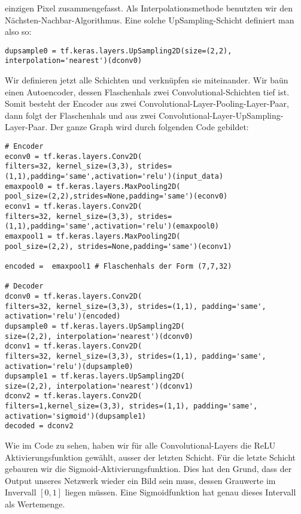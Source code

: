 einzigen Pixel zusammengefasst. Als Interpolationsmethode benutzten wir den Nächsten-Nachbar-Algorithmus.
Eine solche UpSampling-Schicht definiert man also so:
\begin{verbatim}
dupsample0 = tf.keras.layers.UpSampling2D(size=(2,2), interpolation='nearest')(dconv0)
\end{verbatim}
Wir definieren jetzt alle Schichten und verknüpfen sie miteinander. Wir baün
einen Autoencoder, dessen Flaschenhals zwei Convolutional-Schichten tief ist.
Somit besteht der Encoder aus zwei Convolutional-Layer-Pooling-Layer-Paar, dann
folgt der Flaschenhals und aus zwei Convolutional-Layer-UpSampling-Layer-Paar.
Der ganze Graph wird durch folgenden Code gebildet:
\begin{verbatim}
# Encoder
econv0 = tf.keras.layers.Conv2D(
filters=32, kernel_size=(3,3), strides=(1,1),padding='same',activation='relu')(input_data)
emaxpool0 = tf.keras.layers.MaxPooling2D(
pool_size=(2,2),strides=None,padding='same')(econv0)
econv1 = tf.keras.layers.Conv2D(
filters=32, kernel_size=(3,3), strides=(1,1),padding='same',activation='relu')(emaxpool0)
emaxpool1 = tf.keras.layers.MaxPooling2D(
pool_size=(2,2), strides=None,padding='same')(econv1)

encoded =  emaxpool1 # Flaschenhals der Form (7,7,32)

# Decoder
dconv0 = tf.keras.layers.Conv2D(
filters=32, kernel_size=(3,3), strides=(1,1), padding='same', activation='relu')(encoded)
dupsample0 = tf.keras.layers.UpSampling2D(
size=(2,2), interpolation='nearest')(dconv0)
dconv1 = tf.keras.layers.Conv2D(
filters=32, kernel_size=(3,3), strides=(1,1), padding='same', activation='relu')(dupsample0)
dupsample1 = tf.keras.layers.UpSampling2D(
size=(2,2), interpolation='nearest')(dconv1)
dconv2 = tf.keras.layers.Conv2D(
filters=1,kernel_size=(3,3), strides=(1,1), padding='same', activation='sigmoid')(dupsample1)
decoded = dconv2
\end{verbatim}
Wie im Code zu sehen, haben wir für alle Convolutional-Layers die ReLU
Aktivierungsfunktion gewählt, ausser der letzten Schicht. Für die letzte
Schicht gebauren wir die Sigmoid-Aktivierungsfunktion. Dies hat den Grund, dass
der Output unseres Netzwerk wieder ein Bild sein muss, dessen Grauwerte im
Invervall $[0,1]$ liegen müssen. Eine Sigmoidfunktion hat genau dieses
Intervall als Wertemenge.
\para{}

